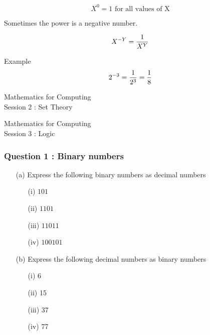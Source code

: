 \documentclass[]{report}
\begin{document}
\begin{enumerate}
\[  X^ 0 = 1 \mbox{ for all values of X} \]

Sometimes the power is a negative number.

\[  X^{-Y} = { 1 \over X^Y}  \]

Example 
\[  2^{-3} = { 1 \over 2^3} = { 1 \over 8}  \]


\newpage
\begin{center}
\huge{Mathematics for Computing}\\
{ Session 2 : Set Theory}
\end{center}



\newpage
\begin{center}
\huge{Mathematics for Computing}\\
{ Session 3 : Logic}
\end{center}




\subsubsection*{Question 1 : Binary numbers}
\begin{itemize}
\item[(a)] Express the following binary numbers as decimal numbers
\begin{multicols}{2}
\begin{itemize}
\item[(i)] $101$
\item[(ii)] $1101$
\item[(iii)] $11011$
\item[(iv)] $100101$
\end{itemize}
\end{multicols}

\item[(b)] Express the following decimal numbers as binary numbers
\begin{multicols}{2}
\begin{itemize}
\item[(i)] 6
\item[(ii)] 15
\item[(iii)] 37
\item[(iv)] 77
\end{itemize}
\end{multicols}


\end{itemize}
\end{enumerate}
\end{document}
